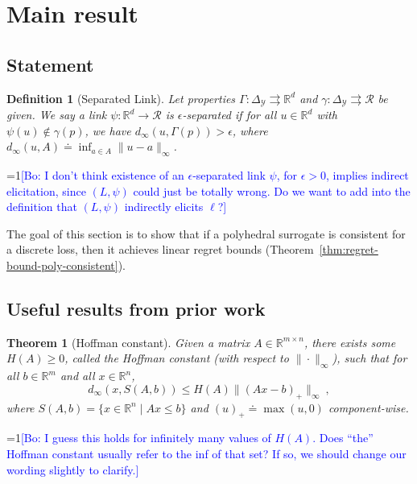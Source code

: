 \documentclass[12pt]{article}
\newcommand{\Comments}{1}
\newcommand{\mynote}[2]{\ifnum\Comments=1\textcolor{#1}{#2}\fi}
\newcommand{\bo}[1]{\mynote{blue}{[Bo: #1]}}
\newcommand{\reals}{\mathbb{R}}
\newcommand{\defeq}{\doteq}%
\newcommand{\simplex}{\Delta_\Y}
\newcommand{\R}{\mathcal{R}}
\newcommand{\Y}{\mathcal{Y}}
\newcommand{\toto}{\rightrightarrows}
\newtheorem{theorem}{Theorem}
\newtheorem{definition}{Definition}
\begin{document}
\section{Main result}

\subsection{Statement}

\begin{definition}[Separated Link]\label{def:sep-link}
  Let properties $\Gamma:\simplex\toto\reals^d$ and $\gamma:\simplex\toto\R$ be given.
  We say a link $\psi:\reals^d\to\R$
  is \emph{$\epsilon$-separated} if for all $u\in\reals^d$ with $\psi(u)\notin\gamma(p)$, we have $d_\infty(u,\Gamma(p)) > \epsilon$, where $d_\infty(u,A) \defeq \inf_{a\in A} \|u-a\|_\infty$.
\end{definition}

\bo{I don't think existence of an $\epsilon$-separated link $\psi$, for $\epsilon > 0$, implies indirect elicitation, since $(L,\psi)$ could just be totally wrong. Do we want to add into the definition that $(L,\psi)$ indirectly elicits $\ell$?}

The goal of this section is to show that if a polyhedral surrogate is consistent for a discrete loss, then it achieves linear regret bounds (Theorem~\ref{thm:regret-bound-poly-consistent}).

\subsection{Useful results from prior work}

\begin{theorem}[Hoffman constant]
  \label{thm:hoffman}
  Given a matrix $A\in\reals^{m\times n}$, there exists some $H(A)\geq 0$, called the \emph{Hoffman constant} (with respect to $\|\cdot\|_\infty$), such that for all $b\in\reals^m$ and all $x\in\reals^n$,
  \begin{equation}
    \label{eq:hoffman}
    d_\infty(x,S(A,b)) \leq H(A) \|(A x - b)_+\|_\infty~,
  \end{equation}
  where $S(A,b) = \{x\in\reals^n \mid A x \leq b\}$ and $(u)_+ \defeq \max(u,0)$ component-wise.
\end{theorem}
\bo{I guess this holds for infinitely many values of $H(A)$. Does ``the'' Hoffman constant usually refer to the inf of that set? If so, we should change our wording slightly to clarify.}
\end{document}
